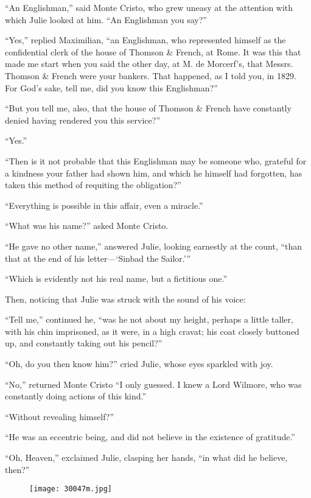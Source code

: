 “An Englishman,” said Monte Cristo, who grew uneasy at the attention
with which Julie looked at him. “An Englishman you say?”

“Yes,” replied Maximilian, “an Englishman, who represented himself as
the confidential clerk of the house of Thomson \& French, at Rome. It
was this that made me start when you said the other day, at M. de
Morcerf’s, that Messrs. Thomson \& French were your bankers. That
happened, as I told you, in 1829. For God’s sake, tell me, did you know
this Englishman?”

“But you tell me, also, that the house of Thomson \& French have
constantly denied having rendered you this service?”

“Yes.”

“Then is it not probable that this Englishman may be someone who,
grateful for a kindness your father had shown him, and which he himself
had forgotten, has taken this method of requiting the obligation?”

“Everything is possible in this affair, even a miracle.”

“What was his name?” asked Monte Cristo.

“He gave no other name,” answered Julie, looking earnestly at the
count, “than that at the end of his letter—‘Sinbad the Sailor.’”

“Which is evidently not his real name, but a fictitious one.”

Then, noticing that Julie was struck with the sound of his voice:

“Tell me,” continued he, “was he not about my height, perhaps a little
taller, with his chin imprisoned, as it were, in a high cravat; his
coat closely buttoned up, and constantly taking out his pencil?”

“Oh, do you then know him?” cried Julie, whose eyes sparkled with joy.

“No,” returned Monte Cristo “I only guessed. I knew a Lord Wilmore, who
was constantly doing actions of this kind.”

“Without revealing himself?”

“He was an eccentric being, and did not believe in the existence of
gratitude.”

“Oh, Heaven,” exclaimed Julie, clasping her hands, “in what did he
believe, then?”

\begin{figure}[ht]
\texttt{[image: 30047m.jpg]}
\end{figure}

